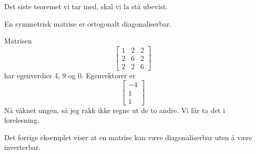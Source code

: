 \noindent Det siste teoremet vi tar med, skal vi la stå ubevist. 
\begin{thm}
En  symmetrisk matrise er ortogonalt diagonaliserbar.
\end{thm}

\begin{ex}
Matrisen 
\[
\begin{bmatrix}
1 & 2 & 2\\  2 &6 & 2 \\ 2 & 2 & 6
\end{bmatrix}
\]
har egenverdier 4, 9 og 0. Egenvektorer er 
\[
\begin{bmatrix}
-4 \\ 1 \\ 1
\end{bmatrix}
\]
Nå våknet ungen, så jeg rakk ikke regne ut de to andre. Vi får ta det i forelesning.
\end{ex}

\begin{merkx}
Det forrige eksemplet viser at en matrise kan være diagonaliserbar uten å være inverterbar.
\end{merkx}







\kapittelslutt
